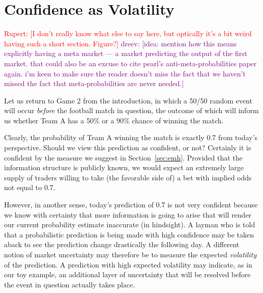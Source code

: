 \documentclass[sigconf,anonymous]{aamas}   %
\newcommand{\rupert}[1]{\ifnum\Chatty=1 \textcolor{red}   {Rupert: [#1]} \fi}
\newcommand{\dreev} [1]{\ifnum\Chatty=1 \textcolor{purple}{dreev:  [#1]} \fi}
\begin{document}


\section{Confidence as Volatility}
\label{sec:options}

\rupert{I don't really know what else to say here, but optically it's a bit weird having such a short section. Figure?}
\dreev{idea: mention how this means explicitly having a meta market --- a market predicting the output of the first market. that could also be an excuse to cite pearl's anti-meta-probabilities paper~\cite{pearl1987} again. i'm keen to make sure the reader doesn't miss the fact that we haven't missed the fact that meta-probabilities are never needed.}

Let us return to Game 2 from the introduction, in which a 50/50 random event will occur \emph{before} the football match in question, the outcome of which will inform us whether Team A has a 50\% or a 90\% chance of winning the match.

Clearly, the probability of Team A winning the match is exactly 0.7 from today's perspective. Should we view this prediction as confident, or not? Certainly it is confident by the measure we suggest in Section~\ref{sec:emh}. Provided that the information structure is publicly known, we would expect an extremely large supply of traders willing to take (the favorable side of) a bet with implied odds not equal to 0.7. 

However, in another sense, today's prediction of 0.7 is not very confident because we know with certainty that more information is going to arise that will render our current probability estimate inaccurate (in hindsight). A layman who is told that a probabilistic prediction is being made with high confidence may be taken aback to see the prediction change drastically the following day. A different notion of market uncertainty may therefore be to measure the expected \emph{volatility} of the prediction. A prediction with high expected volatility may indicate, as in our toy example, an additional layer of uncertainty that will be resolved before the event in question actually takes place. 
\end{document}
